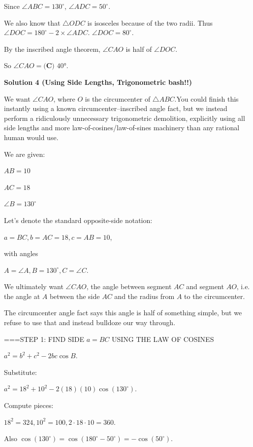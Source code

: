 \begin{enumerate}
 Since $\angle ABC = 130^{\circ}$, $\angle ADC = 50^{\circ}$.

 We also know that $\triangle ODC$ is isosceles because of the two radii. Thus $\angle DOC = 180^{\circ} - 2{\times} \angle ADC$. $\angle DOC = 80^{\circ}$.

 By the inscribed angle theorem, $\angle CAO$ is half of $\angle DOC$.

 So $\angle CAO = \boxed{\textbf{(C) }40\textbf{°}}$.

 



\textbf{Solution 4 (Using Side Lengths, Trigonometric bash!!)}

We want \( \angle CAO \), where \( O \) is the circumcenter of \( \triangle ABC \).You could finish this instantly using a known circumcenter–inscribed angle fact, but we instead perform a ridiculously unnecessary trigonometric demolition, explicitly using all side lengths and more law-of-cosines/law-of-sines machinery than any rational human would use.

 We are given:

 \( AB = 10 \)

 \( AC = 18 \)

 \( \angle B = 130^\circ \)

 Let’s denote the standard opposite-side notation:

 \( a = BC, b = AC = 18, c = AB = 10 \),

 with angles

 \( A = \angle A, B = 130^\circ, C = \angle C \).

 We ultimately want \( \angle CAO \), the angle between segment \( AC \) and segment \( AO \), i.e. the angle at \( A \) between the side \( AC \) and the radius from \( A \) to the circumcenter.

 The circumcenter angle fact says this angle is half of something simple, but we refuse to use that and instead bulldoze our way through.

 
===STEP 1: FIND SIDE \( a = BC \) USING THE LAW OF COSINES

 
\( a^2 = b^2 + c^2 - 2bc \cos B \).

 Substitute:

 \( a^2 = 18^2 + 10^2 - 2(18)(10) \cos(130^\circ) \).

 Compute pieces:

 \( 18^2 = 324, 10^2 = 100, 2 \cdot 18 \cdot 10 = 360 \).

 Also \( \cos(130^\circ) = \cos(180^\circ - 50^\circ) = - \cos(50^\circ) \).


\end{enumerate}
